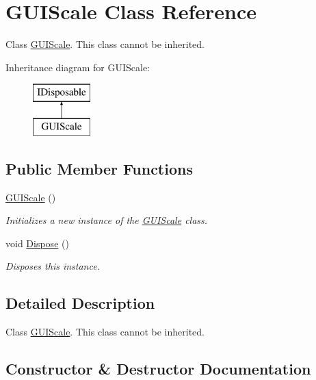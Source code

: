\hypertarget{class_g_u_i_scale}{}\section{G\+U\+I\+Scale Class Reference}
\label{class_g_u_i_scale}


Class \hyperlink{class_g_u_i_scale}{G\+U\+I\+Scale}. This class cannot be inherited.  


Inheritance diagram for G\+U\+I\+Scale\+:\begin{figure}[H]
\begin{center}
\leavevmode
\includegraphics[height=2.000000cm]{class_g_u_i_scale}
\end{center}
\end{figure}
\subsection*{Public Member Functions}
\begin{DoxyCompactItemize}
\item 
\hyperlink{class_g_u_i_scale_aa72cd8ed1f3b3914b8a8494a8aa36925}{G\+U\+I\+Scale} ()
\begin{DoxyCompactList}\small\item\em Initializes a new instance of the \hyperlink{class_g_u_i_scale}{G\+U\+I\+Scale} class. \end{DoxyCompactList}\item 
void \hyperlink{class_g_u_i_scale_aa00049ce6abb6b97382a00260f32952d}{Dispose} ()
\begin{DoxyCompactList}\small\item\em Disposes this instance. \end{DoxyCompactList}\end{DoxyCompactItemize}


\subsection{Detailed Description}
Class \hyperlink{class_g_u_i_scale}{G\+U\+I\+Scale}. This class cannot be inherited. 



\subsection{Constructor \& Destructor Documentation}
\mbox{\label{class_g_u_i_scale_aa72cd8ed1f3b3914b8a8494a8aa36925}} 
